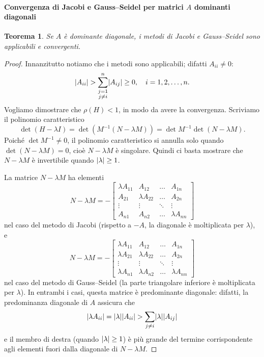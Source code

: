 \documentclass[a4paper]{report}
\DeclarePairedDelimiter{\abs}{\lvert}{\rvert}
\newtheorem{theorem}{Teorema}[chapter]
\theoremstyle{definiton}
\theoremstyle{remark}
\begin{document}
\paragraph{Convergenza di Jacobi e Gauss--Seidel per matrici $A$ dominanti diagonali}
\begin{theorem}
Se $A$ è dominante diagonale, i metodi di Jacobi e Gauss--Seidel sono applicabili e convergenti.
\end{theorem}
\begin{proof}
Innanzitutto notiamo che i metodi sono applicabili; difatti $A_{ii} \neq 0$:
\[
\abs{A_{ii}} > \sum_{\substack{j=1\\j\neq i}}^n \abs{A_{ij}} \geq 0, \quad i=1,2,\dots,n.
\]
Vogliamo dimostrare che $\rho(H)<1$, in modo da avere la convergenza. Scriviamo il polinomio caratteristico
\[
\det (H - \lambda I) = \det (M^{-1}(N-\lambda M)) = \det M^{-1} \det (N-\lambda M).
\]
Poiché $\det M^{-1} \neq 0$, il polinomio caratteristico si annulla solo quando $\det (N-\lambda M) = 0$, cioè $N-\lambda M$ è singolare. Quindi ci basta mostrare che $N-\lambda M$ è invertibile quando $\abs{\lambda} \geq 1$.

La matrice $N-\lambda M$ ha elementi
\[
N-\lambda M = -
\begin{bmatrix}
    \lambda A_{11} & A_{12} & \dots & A_{1n}\\
    A_{21} & \lambda A_{22} & \dots & A_{2n}\\
    \vdots & \vdots & \ddots & \vdots\\
    A_{n1} & A_{n2} & \dots & \lambda A_{nn}
\end{bmatrix}
\]
nel caso del metodo di Jacobi (rispetto a $-A$, la diagonale è moltiplicata per $\lambda$), e 
\[
N-\lambda M = -
\begin{bmatrix}
    \lambda A_{11} & A_{12} & \dots & A_{1n}\\
    \lambda A_{21} & \lambda A_{22} & \dots & A_{2n}\\
    \vdots & \vdots & \ddots & \vdots\\
    \lambda A_{n1} & \lambda A_{n2} & \dots & \lambda A_{nn}
\end{bmatrix}
\]
nel caso del metodo di Gauss--Seidel (la parte triangolare inferiore è moltiplicata per $\lambda$). In entrambi i casi, questa matrice è predominante diagonale: difatti, la predominanza diagonale di $A$ assicura che
\[
\abs{\lambda A_{ii}} = \abs{\lambda}\abs{ A_{ii}} > \sum_{j\neq i} \abs{\lambda} \abs{A_{ij}}
\]
e il membro di destra (quando $\abs{\lambda} \geq 1$) è più grande del termine corrispondente agli elementi fuori dalla diagonale di $N-\lambda M$.
\end{proof}
\end{document}
